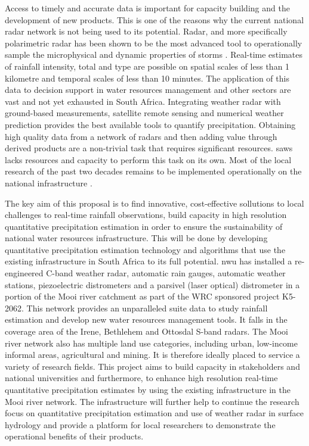 \documentclass{wrcreport}
\begin{document}
Access to timely and accurate data is important for capacity building
and the development of new products. This is one of the reasons why
the current national radar network is not being used to its potential.
Radar, and more specifically polarimetric radar has been shown to be
the most advanced tool to operationally sample the microphysical and
dynamic properties of storms \citep{Hall1984, Bringi1986, Straka2000a,
Bringi2002, Gorgucci2002}.  Real-time estimates of rainfall intensity,
total and type are possible on spatial scales of less than 1 kilometre
and temporal scales of less than 10 minutes. The application of this
data to decision support in water resources management and other
sectors are vast and not yet exhausted in South Africa. Integrating
weather radar with ground-based measurements, satellite remote sensing
and numerical weather prediction provides the best available tools to
quantify precipitation. Obtaining high quality data from a network of
radars and then adding value through derived products are a
non-trivial task that requires significant resources. \gls{saws} lacks
resources and capacity to perform this task on its own. Most of the
local research of the past two decades remains to be implemented
operationally on the national infrastructure
\citep{Mittermaier2000,Pegram2001, Terblanche2001a, Terblanche2001b,
Clothier2002, Pegram2002, Kroese2004, Kroese2006, Sinclair2004,
Sinclair2005, Sinclair2009, Wesson2006, Vischel2007, Vischel2008}.

The key aim of this proposal is to find innovative, cost-effective
sollutions to local challenges to real-time rainfall observations,
build capacity in high resolution quantitative precipitation
estimation in order to ensure the sustainability of national water
resources infrastructure. This will be done by developing quantitative
precipitation estimation technology and algorithms that use the
existing infrastructure in South Africa to its full potential.
\gls{nwu} has installed a re- engineered C-band weather radar,
automatic rain gauges, automatic weather stations, piezoelectric
distrometers and a parsivel (laser optical) distrometer in a portion
of the Mooi river catchment as part of the WRC sponsored project
K5-2062. This network provides an unparalleled suite data to study
rainfall estimation and develop new water resources management tools.
It falls in the coverage area of the Irene, Bethlehem and Ottosdal
S-band radars. The Mooi river network also has multiple land use
categories, including urban, low-income informal areas, agricultural
and mining. It is therefore ideally placed to service a variety of
research fields. This project aims to build capacity in stakeholders
and national universities and furthermore, to enhance high resolution
real-time quantitative precipitation estimates by using the existing
infrastructure in the Mooi river network. The infrastructure will
further help to continue the research focus on quantitative
precipitation estimation and use of weather radar in surface hydrology
and provide a platform for local researchers to demonstrate the
operational benefits of their products.
\end{document}
